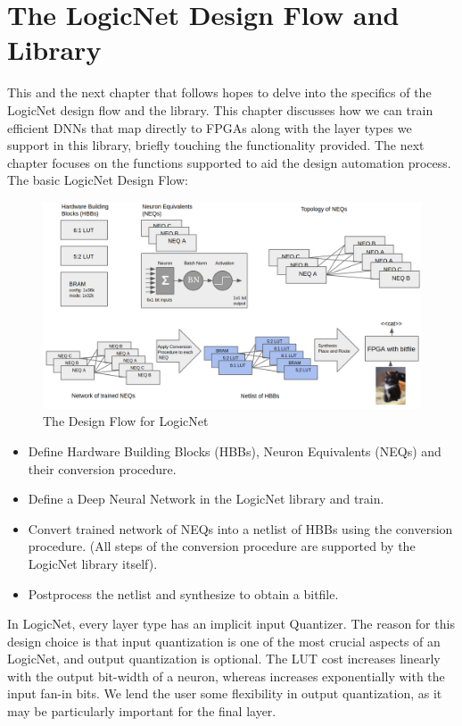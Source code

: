\chapter{The LogicNet Design Flow and Library}\label{ch:intro-fpganet}

\hspace{1.5em}
This and the next chapter that follows hopes to delve into the specifics of the LogicNet design flow and the library. This chapter discusses how we can train efficient DNNs that map directly to FPGAs along with the layer types we support in this library, briefly touching the functionality provided. The next chapter focuses on the functions supported to aid the design automation process. The basic LogicNet Design Flow:
\begin{figure}
    \centering
    \includegraphics[width=380pt]{figures/bison/designflow.png}
    \caption{The Design Flow for LogicNet}
    \label{fig:designflowfpganet}
\end{figure}
\begin{itemize}
    \item Define Hardware Building Blocks (HBBs), Neuron Equivalents (NEQs) and their conversion procedure.
    \item Define a Deep Neural Network in the LogicNet library and train.
    \item Convert trained network of NEQs into a netlist of HBBs using the conversion procedure. (All steps of the conversion procedure are supported by the LogicNet library itself).
    \item Postprocess the netlist and synthesize to obtain a bitfile.\\
\end{itemize} 
In LogicNet, every layer type has an implicit input Quantizer. The reason for this design choice is that input quantization is one of the most crucial aspects of an LogicNet, and output quantization is optional. The LUT cost increases linearly with the output bit-width of a neuron, whereas increases exponentially with the input fan-in bits. We lend the user some flexibility in output quantization, as it may be particularly important for the final layer. 
